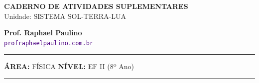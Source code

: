 \documentclass[twoside, 10pt, a4paper]{article}
\begin{document}
\thispagestyle{empty}
\color{Cinzablack}
\vspace*{-1.8cm}

\noindent
\begin{minipage}{\textwidth}
    \selectfont
    \noindent
    \begin{minipage}[t]{0.70\linewidth}
        {\Large \bfseries \MakeUppercase{Caderno de Atividades Suplementares}}\\[0.1cm]
        {\large \textmd{\textcolor{CinzaEscuro}{Unidade: SISTEMA SOL-TERRA-LUA}}}
    \end{minipage}%
    \begin{minipage}[t]{0.30\linewidth}
        \raggedleft
        \small \textbf{Prof. Raphael Paulino}\\
        \textsf{\small \textcolor{indigo}{\texttt{profraphaelpaulino.com.br}}}
    \end{minipage}
    
    \vspace{0.15cm}
    \noindent\rule{\linewidth}{1.2pt}
    \vspace{-0.1cm}
    \footnotesize\textsf{\textbf{ÁREA:} FÍSICA \hfill \textbf{NÍVEL:} EF II (8º Ano)}
    \vspace{0.1cm}
    \noindent\rule{\linewidth}{0.4pt}
\end{minipage}
\end{document}
